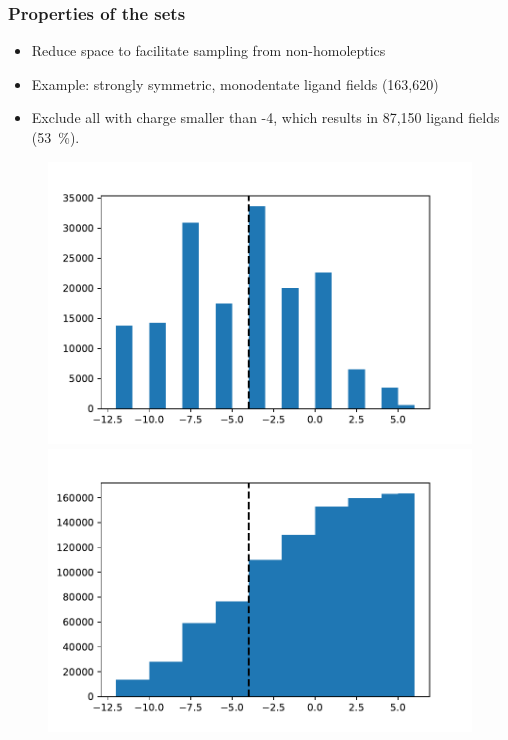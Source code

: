 \documentclass[xcolor=dvipsnames]{beamer}
\begin{document}
\begin{frame}
\frametitle{Properties of the sets}
\begin{itemize}
\item Reduce space to facilitate sampling from non-homoleptics
\item Example: strongly symmetric, monodentate ligand fields (163,620)
\item Exclude all with charge smaller than -4, which results in 87,150 ligand fields (53~\%).
\end{itemize}

\begin{figure}[ht] 
	\begin{minipage}[b]{0.5\linewidth}
		\centering
		\includegraphics[width=.8\linewidth]{img/strongsymMonodentates_chargeHist.pdf} 
		\vspace{4ex}
	\end{minipage}%
	\begin{minipage}[b]{0.5\linewidth}
		\centering
		\includegraphics[width=.8\linewidth]{img/strongsymMonodentates_chargeHistCum.pdf} 
		\vspace{4ex}
	\end{minipage} 
\end{figure}
\end{frame}
\end{document}
